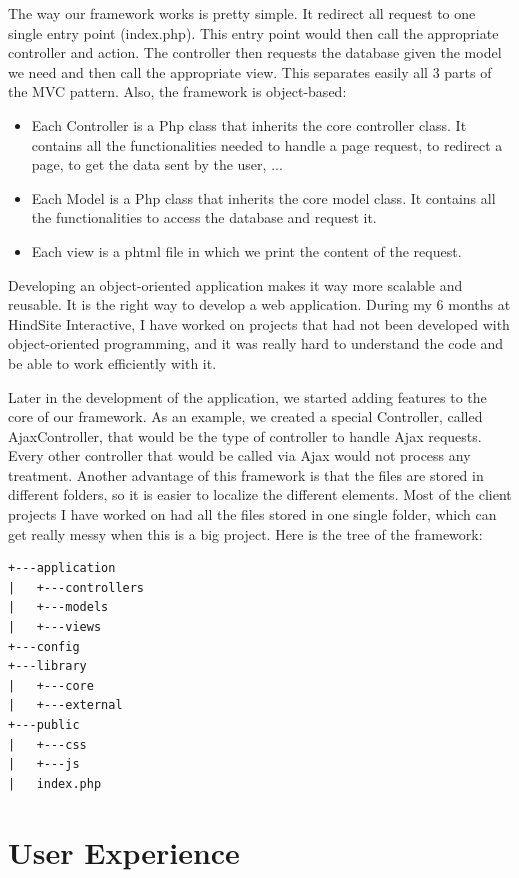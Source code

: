 The way our framework works is pretty simple. It redirect all request to one single entry point (index.php). This entry point would then call the appropriate controller and action. The controller then requests the database given the model we need and then call the appropriate view. This separates easily all 3 parts of the MVC pattern.
Also, the framework is object-based: 
\begin{itemize}
\item Each Controller is a Php class that inherits the core controller class. It contains all the functionalities needed to handle a page request, to redirect a page, to get the data sent by the user, ...
\item Each Model is a Php class that inherits the core model class. It contains all the functionalities to access the database and request it.
\item Each view is a phtml file in which we print the content of the request.
\end{itemize}
Developing an object-oriented application makes it way more scalable and reusable. It is the right way to develop a web application. During my 6 months at HindSite Interactive, I have worked on projects that had not been developed with object-oriented programming, and it was really hard to understand the code and be able to work efficiently with it. 

Later in the development of the application, we started adding features to the core of our framework. As an example, we created a special Controller, called AjaxController, that would be the type of controller to handle Ajax requests. Every other controller that would be called via Ajax would not process any treatment.
Another advantage of this framework is that the files are stored in different folders, so it is easier to localize the different elements. Most of the client projects I have worked on had all the files stored in one single folder, which can get really messy when this is a big project.
Here is the tree of the framework:
\begin{verbatim}
+---application
|   +---controllers
|   +---models
|   +---views
+---config
+---library
|   +---core
|   +---external
+---public
|   +---css
|   +---js
|   index.php
\end{verbatim}

\section{User Experience}

